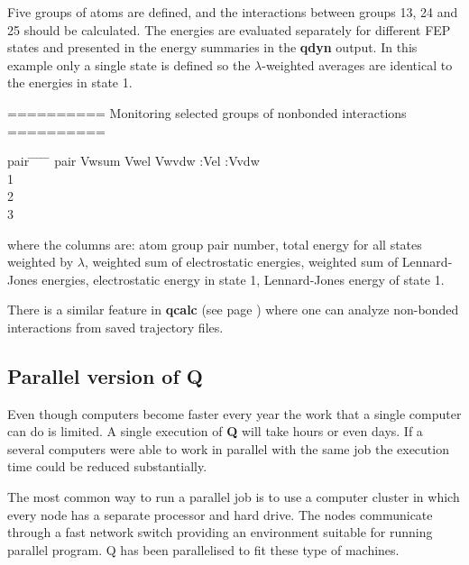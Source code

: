 \documentclass[a4paper,10pt]{article}
\begin{document}
Five groups of atoms are defined, and the interactions between
groups 1{\-}3, 2{\-}4 and 2{\-}5 should be calculated. The
energies are evaluated separately for different FEP states and
presented in the energy summaries in the \textbf{qdyn} output. In this
example only a single state is defined so the $\lambda $-weighted
averages are identical to the energies in state 1.

========== Monitoring selected groups of nonbonded interactions ==========
\begin{tabbing}
  pair \= \hspace{40pt}  \= \hspace{40pt}  \= \hspace{40pt}  \= \hspace{40pt}  \= \hspace{40pt} \kill
  pair \> Vwsum  \> Vwel    \> Vwvdw  :Vel   :Vvdw \\
  1             \\
  2                 \\
  3                 \\
\end{tabbing}

where the columns are: atom group pair number, total energy for
all states weighted by $\lambda $, weighted sum of electrostatic
energies, weighted sum of Lennard-Jones energies, electrostatic
energy in state 1, Lennard-Jones energy of state 1.

There is a similar feature in \textbf{qcalc} (see page
\pageref{subsubsec:qcalc}) where one can analyze non-bonded
interactions from saved trajectory files.

\subsection{Parallel version of Q} Even though computers become
faster every year the work that a single computer can do is
limited. A single execution of \textbf{Q} will take hours or even days. If
a several computers were able to work in parallel with the same
job the execution time could be reduced substantially.

The most common way to run a parallel job is to use a computer
cluster in which every node has a separate processor and hard
drive. The nodes communicate through a fast network switch
providing an environment suitable for running parallel program. Q
has been parallelised to fit these type of machines.
\end{document}
